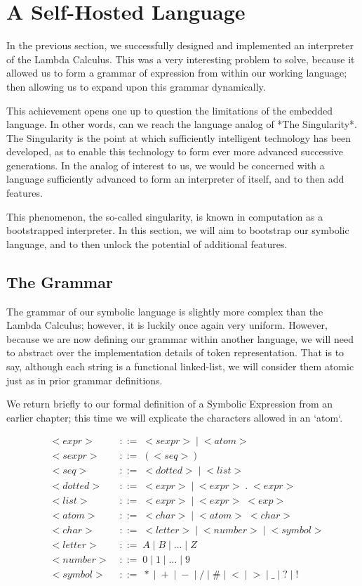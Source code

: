 
\chapter{A Self-Hosted Language }

In the previous section, we successfully designed and implemented an
interpreter of the Lambda Calculus. This was a very interesting problem to
solve, because it allowed us to form a grammar of expression from within our
working language; then allowing us to expand upon this grammar dynamically.

This achievement opens one up to question the limitations of the embedded
language. In other words, can we reach the language analog of *The 
Singularity*. The Singularity is the point at which sufficiently intelligent 
technology has been developed, as to enable this technology to form ever more 
advanced successive generations. In the analog of interest to us, we would be 
concerned with a language sufficiently advanced to form an interpreter of 
itself, and to then add features.

This phenomenon, the so-called singularity, is known in computation as a 
bootstrapped interpreter. In this section, we will aim to bootstrap our 
symbolic language, and to then unlock the potential of additional features.

\section{The Grammar}
The grammar of our symbolic language is slightly more complex than the Lambda 
Calculus; however, it is luckily once again very uniform. However, because we 
are now defining our grammar within another language, we will need to 
abstract over the implementation details of token representation. That is to 
say, although each string is a functional linked-list, we will consider them 
atomic just as in prior grammar definitions.

We return briefly to our formal definition of a Symbolic Expression from an 
earlier chapter; this time we will explicate the characters allowed in an 
`atom`.

\begin{align*}
& <expr> \; &::= \; <sexpr> \; | \; <atom>
\\& <sexpr> \; &::= \; (<seq>)
\\& <seq> \; &::= \; <dotted> \; | \; <list>
\\& <dotted> \; &::= \; <expr> \; | \; <expr> \; . \; <expr>
\\& <list> \; &::= \; <expr> \; | \; <expr> \; <exp>
\\& <atom> \; &::= \; <char> \; | \; <atom> \; <char>
\\& <char> \; &::= \; <letter> \; | \; <number> \; | \; <symbol>
\\& <letter> \; &::= \; A \; | \; B \; | \; \dots \; | \; Z
\\& <number> \; &::= \; 0 \; | \; 1 \; | \; \dots \; | \; 9
\\& <symbol> \; &::= \; * \; | \; + \; | \; - \; | \; / \; | \; \# \; | \; < \; | \; > \; | \; \_ \; | \; ? \; | \; !
\end{align*}

